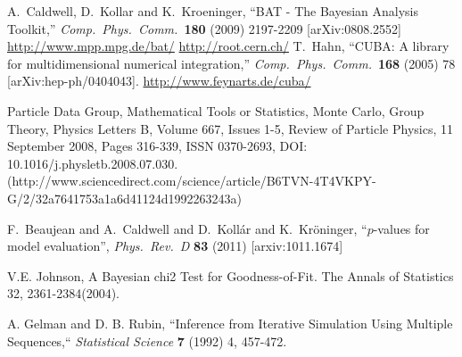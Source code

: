 \documentclass[11pt, a4paper]{article}
\begin{document}




\begin{thebibliography}{99}
  A.~Caldwell, D.~Kollar and K.~Kroeninger, ``BAT - The Bayesian
  Analysis Toolkit,'' \textit{Comp.\ Phys.\ Comm.}\ {\bf 180} (2009) 2197-2209
  [arXiv:0808.2552]
  \url{http://www.mpp.mpg.de/bat/}
%
  \url{http://root.cern.ch/}
%
  T.~Hahn, ``CUBA: A library for multidimensional numerical
  integration,'' \textit{Comp.\ Phys.\ Comm.}\ {\bf 168} (2005) 78
  [arXiv:hep-ph/0404043].
%
  \url{http://www.feynarts.de/cuba/}

Particle Data Group, Mathematical Tools or Statistics, Monte Carlo, Group Theory, Physics Letters B, Volume 667, Issues 1-5, Review of Particle Physics, 11 September 2008, Pages 316-339, ISSN 0370-2693, DOI: 10.1016/j.physletb.2008.07.030.
(http://www.sciencedirect.com/science/article/B6TVN-4T4VKPY-G/2/32a7641753a1a6d41124d1992263243a)

F.~Beaujean and A.~Caldwell and D.~Koll{\'a}r and K.~Kr{\"o}ninger,
``$p$-values for model evaluation'', \textit{Phys.\ Rev.\ D} {\bf 83} (2011)
[arxiv:1011.1674]

V.E. Johnson,  A Bayesian chi2 Test for Goodness-of-Fit. The Annals of Statistics 32, 2361-2384(2004).

A. Gelman and D. B. Rubin, ``Inference from Iterative Simulation Using Multiple Sequences,`` \emph{Statistical Science}   {\bf 7} (1992) 4,  457-472.


\end{thebibliography}

\end{document}
